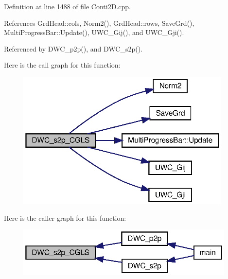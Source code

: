Definition at line 1488 of file Conti2\+D.\+cpp.



References Grd\+Head\+::cols, Norm2(), Grd\+Head\+::rows, Save\+Grd(), Multi\+Progress\+Bar\+::\+Update(), U\+W\+C\+\_\+\+Gij(), and U\+W\+C\+\_\+\+Gji().



Referenced by D\+W\+C\+\_\+p2p(), and D\+W\+C\+\_\+s2p().

Here is the call graph for this function\+:
\nopagebreak
\begin{figure}[H]
\begin{center}
\leavevmode
\includegraphics[width=305pt]{Conti2D_8h_a6516cfeb71abcf844b32f101e5f77a71_a6516cfeb71abcf844b32f101e5f77a71_cgraph}
\end{center}
\end{figure}
Here is the caller graph for this function\+:\nopagebreak
\begin{figure}[H]
\begin{center}
\leavevmode
\includegraphics[width=310pt]{Conti2D_8h_a6516cfeb71abcf844b32f101e5f77a71_a6516cfeb71abcf844b32f101e5f77a71_icgraph}
\end{center}
\end{figure}
\mbox{\label{Conti2D_8h_a39a6a4cc378c878de458d5ae56eb1630_a39a6a4cc378c878de458d5ae56eb1630}} 
